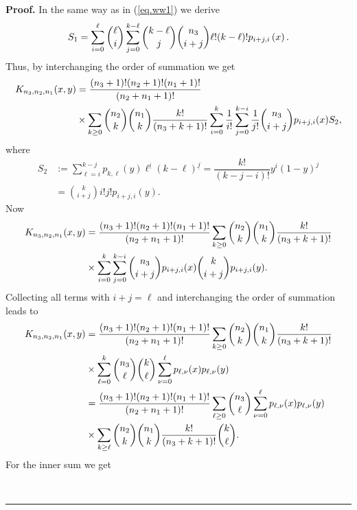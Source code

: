 \documentclass[12pt,reqno]{article}
\newenvironment{proof}[1][Proof]{\noindent\textbf{#1.} }{\ \rule{0.5em}{0.5em}}
\begin{document}
\begin{proof}
In the same way as in (\ref{eq.ww1}) we derive 
\begin{equation*}
S_{1}=\displaystyle \sum_{i=0}^{\ell }{\binom{\ell }{i}}\sum_{j=0}^{k-\ell }{%
\binom{k-\ell }{j}}{\binom{n_{3}}{i+j}}\ell !(k-\ell )!p_{i+j,i}\left(
x\right) .
\end{equation*}%
Thus, by interchanging the order of summation we get 
\begin{align*}
K_{n_{3},n_{2},n_{1}}(x,y)& =\dfrac{(n_{3}+1)!(n_{2}+1)!(n_{1}+1)!}{%
(n_{2}+n_{1}+1)!} \\
& \times \sum_{k\geq 0}{\binom{n_{2}}{k}}{\binom{n_{1}}{k}}\dfrac{k!}{%
(n_{3}+k+1)!}\sum_{i=0}^{k}\dfrac{1}{i!}\sum_{j=0}^{k-i}\dfrac{1}{j!}{\binom{%
n_{3}}{i+j}}p_{i+j,i}(x)S_{2},
\end{align*}%
where 
\begin{align*}
S_{2}& :=\displaystyle \sum_{\ell =i}^{k-j}p_{k,\ell }(y)\ell ^{\underline{i}%
}(k-\ell )^{\underline{j}}=\dfrac{k!}{(k-j-i)!}y^{i}(1-y)^{j} \\
& ={\binom{k}{i+j}}i!j!p_{i+j,i}(y).
\end{align*}%
Now 
\begin{align*}
K_{n_{3},n_{2},n_{1}}(x,y)& =\dfrac{(n_{3}+1)!(n_{2}+1)!(n_{1}+1)!}{%
(n_{2}+n_{1}+1)!}\sum_{k\geq 0}{\binom{n_{2}}{k}}{\binom{n_{1}}{k}}\dfrac{k!%
}{(n_{3}+k+1)!} \\
& \times \sum_{i=0}^{k}\sum_{j=0}^{k-i}{\binom{n_{3}}{i+j}}p_{i+j,i}(x){%
\binom{k}{i+j}}p_{i+j,i}(y).
\end{align*}%
Collecting all terms with $i+j=\ell $ and interchanging the order of
summation leads to 
\begin{align*}
K_{n_{3},n_{2},n_{1}}(x,y)& =\dfrac{(n_{3}+1)!(n_{2}+1)!(n_{1}+1)!}{%
(n_{2}+n_{1}+1)!}\sum_{k\geq 0}{\binom{n_{2}}{k}}{\binom{n_{1}}{k}}\dfrac{k!%
}{(n_{3}+k+1)!} \\
& \times \sum_{\ell =0}^{k}{\binom{n_{3}}{\ell }}{\binom{k}{\ell }}\sum_{\nu
=0}^{\ell }p_{\ell ,\nu }(x)p_{\ell ,\nu }(y) \\
& =\dfrac{(n_{3}+1)!(n_{2}+1)!(n_{1}+1)!}{(n_{2}+n_{1}+1)!}\sum_{\ell \geq 0}%
{\binom{n_{3}}{\ell }}\sum_{\nu =0}^{\ell }p_{\ell ,\nu }(x)p_{\ell ,\nu }(y)
\\
& \times \sum_{k\geq \ell }{\binom{n_{2}}{k}}{\binom{n_{1}}{k}}\dfrac{k!}{%
(n_{3}+k+1)!}{\binom{k}{\ell }}.
\end{align*}%
For the inner sum we get


\end{proof}
\end{document}
